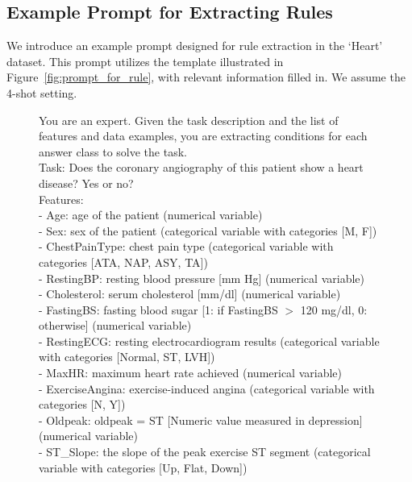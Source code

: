 \documentclass{article}
\theoremstyle{plain}
\theoremstyle{definition}
\theoremstyle{remark}
\begin{document}
\subsection{Example Prompt for Extracting Rules}
\label{sec:example_rule}
We introduce an example prompt designed for rule extraction in the `Heart' dataset. This prompt utilizes the template illustrated in Figure~\ref{fig:prompt_for_rule}, with relevant information filled in. We assume the 4-shot setting.

\begin{figure}[ht!]
\vspace{-3mm}
\begin{tcolorbox}[enhanced,attach boxed title to top center={yshift=-3mm,yshifttext=-1mm},
  colback=black!0!white, colframe=black!20!white, colbacktitle=black!10!white, coltitle=blue!20!black ]
\footnotesize{
You are an expert. Given the task description and the list of features and data examples, you are extracting conditions for each answer class to solve the task. \\

Task: Does the coronary angiography of this patient show a heart disease? Yes or no? \\

Features: \\
- Age: age of the patient (numerical variable)\\
- Sex: sex of the patient (categorical variable with categories [M, F])\\
- ChestPainType: chest pain type (categorical variable with categories [ATA, NAP, ASY, TA])\\
- RestingBP: resting blood pressure [mm Hg] (numerical variable)\\
- Cholesterol: serum cholesterol [mm/dl] (numerical variable)\\
- FastingBS: fasting blood sugar [1: if FastingBS $>$ 120 mg/dl, 0: otherwise] (numerical variable)\\
- RestingECG: resting electrocardiogram results (categorical variable with categories [Normal, ST, LVH])\\
- MaxHR: maximum heart rate achieved (numerical variable)\\
- ExerciseAngina: exercise-induced angina (categorical variable with categories [N, Y])\\
- Oldpeak: oldpeak = ST [Numeric value measured in depression] (numerical variable)\\
- ST\_Slope: the slope of the peak exercise ST segment (categorical variable with categories [Up, Flat, Down])\\


}
\end{tcolorbox}
\end{figure}
\end{document}
